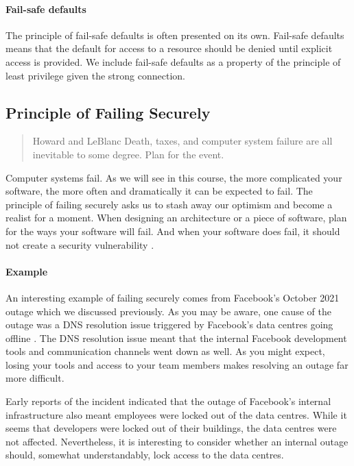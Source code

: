\paragraph{Fail-safe defaults}
The principle of fail-safe defaults is often presented on its own.
Fail-safe defaults means that the default for access to a resource should be denied until explicit access is provided.
We include fail-safe defaults as a property of the principle of least privilege given the strong connection.

\subsection{Principle of Failing Securely}

\begin{quote}{Howard and LeBlanc \cite{death-taxes-and-failure}}
Death, taxes, and computer system failure are all inevitable to some degree. Plan for the event.
\end{quote}

\noindent Computer systems fail.
As we will see in this course, the more complicated your software, the more often and dramatically it can be expected to fail.
The principle of failing securely asks us to stash away our optimism and become a realist for a moment.
When designing an architecture or a piece of software, plan for the ways your software will fail.
And when your software does fail, it should not create a security vulnerability \cite{failing-securely}.

\paragraph{Example}
An interesting example of failing securely comes from Facebook's October 2021 outage which we discussed previously.
As you may be aware, one cause of the outage was a DNS resolution issue triggered by Facebook's data centres going offline \cite{facebook-outage}.
The DNS resolution issue meant that the internal Facebook development tools and communication channels went down as well.
As you might expect, losing your tools and access to your team members makes resolving an outage far more difficult.

Early reports of the incident indicated that the outage of Facebook's internal infrastructure also meant employees were locked out of the data centres.
While it seems that developers were locked out of their buildings, the data centres were not affected.
Nevertheless, it is interesting to consider whether an internal outage should, somewhat understandably, lock access to the data centres.


